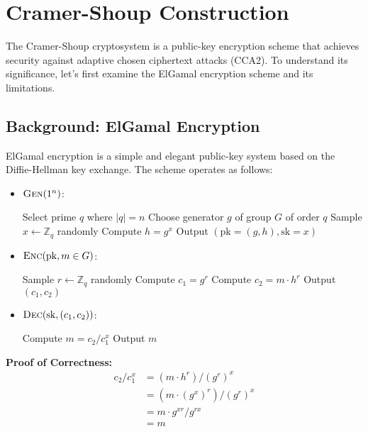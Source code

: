 \section{Cramer-Shoup Construction}

The Cramer-Shoup cryptosystem is a public-key encryption scheme that achieves security against adaptive chosen ciphertext attacks (CCA2). To understand its significance, let's first examine the ElGamal encryption scheme and its limitations.

\subsection{Background: ElGamal Encryption}

ElGamal encryption is a simple and elegant public-key system based on the Diffie-Hellman key exchange. The scheme operates as follows:

\begin{itemize}
    \item $\textsc{Gen}(1^n)$:
        \begin{algorithmic}
            \State Select prime $q$ where $|q|=n$
            \State Choose generator $g$ of group $G$ of order $q$
            \State Sample $x \gets \mathbb{Z}_q$ randomly
            \State Compute $h = g^x$
            \State Output $(\mathrm{pk}=(g,h), \mathrm{sk}=x)$
        \end{algorithmic}
    
    \item $\textsc{Enc}(\mathrm{pk}, m \in G)$:
        \begin{algorithmic}
            \State Sample $r \gets \mathbb{Z}_q$ randomly
            \State Compute $c_1 = g^r$
            \State Compute $c_2 = m \cdot h^r$
            \State Output $(c_1, c_2)$
        \end{algorithmic}

    \item $\textsc{Dec}(\mathrm{sk}, (c_1, c_2))$:
        \begin{algorithmic}
            \State Compute $m = c_2/c_1^x$
            \State Output $m$
        \end{algorithmic}
\end{itemize}

\textbf{Proof of Correctness:}
\begin{align*}
    c_2/c_1^x &= (m \cdot h^r)/(g^r)^x \\
    &= (m \cdot (g^x)^r)/(g^r)^x \\
    &= m \cdot g^{xr}/g^{rx} \\
    &= m
\end{align*}

